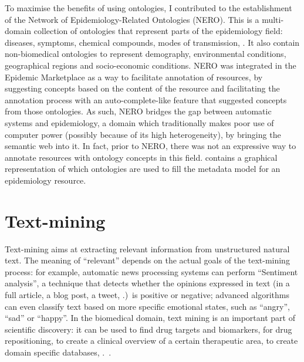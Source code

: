 To maximise the benefits of using ontologies, I contributed to the establishment of the Network of Epidemiology-Related Ontologies (NERO). This is a multi-domain collection of ontologies that represent parts of the epidemiology field: \eg diseases, symptoms, chemical compounds, modes of transmission, \etc. It also contain non-biomedical ontologies to represent demography, environmental conditions, geographical regions and socio-economic conditions. NERO was integrated in the Epidemic Marketplace as a way to facilitate annotation of resources, by suggesting concepts based on the content of the resource and facilitating the annotation process with an auto-complete-like feature that suggested concepts from those ontologies. As such, NERO bridges the gap between automatic systems and epidemiology, a domain which traditionally makes poor use of computer power (possibly because of its high heterogeneity), by bringing the semantic web into it. In fact, prior to NERO, there was not an expressive way to annotate resources with ontology concepts in this field.  contains a graphical representation of which ontologies are used to fill the metadata model for an epidemiology resource.


\section{Text-mining} \label{sec:auxiliary-projects/text-mining}

Text-mining aims at extracting relevant information from unstructured natural text. The meaning of ``relevant'' depends on the actual goals of the text-mining process: for example, automatic news processing systems can perform ``Sentiment analysis'', a technique that detects whether the opinions expressed in text (in a full article, a blog post, a tweet, \etc.)\ is positive or negative; advanced algorithms can even classify text based on more specific emotional states, such as ``angry'', ``sad'' or ``happy''. In the biomedical domain, text mining is an important part of scientific discovery: it can be used to find drug targets and biomarkers, for drug repositioning, to create a clinical overview of a certain therapeutic area, to create domain specific databases, \etc.~\citep{Fleuren2015}.

